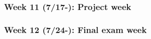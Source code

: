 \subsubsection{Week 11 (7/17-): Project week} %
\subsubsection{Week 12 (7/24-): Final exam week}%


